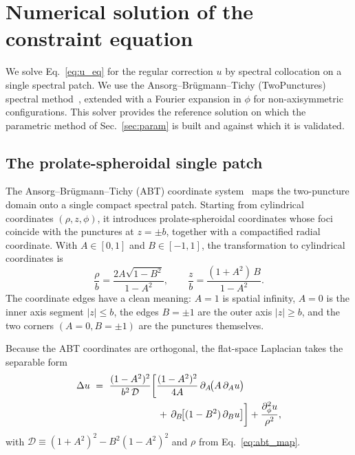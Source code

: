 \documentclass[
  aps,
  prd,
  twocolumn,
  amsmath,
  amssymb,
  nofootinbib,
  superscriptaddress,
  floatfix,
]{revtex4-2}
\begin{document}
\section{Numerical solution of the constraint equation}
\label{sec:solve}
We solve Eq.~\eqref{eq:u_eq} for the regular correction $u$ by spectral collocation on a single spectral patch.
We use the Ansorg--Br\"ugmann--Tichy (TwoPunctures) spectral method~\cite{AnsorgBruegmannTichy2004}, extended with a Fourier expansion in $\phi$ for non-axisymmetric configurations.
This solver provides the reference solution on which the parametric method of Sec.~\ref{sec:param} is built and against which it is validated.


\subsection{The prolate-spheroidal single patch}
\label{sec:solve:abt}

The Ansorg--Br\"ugmann--Tichy (ABT) coordinate system~\cite{AnsorgBruegmannTichy2004} maps the two-puncture domain onto a single compact spectral patch.
Starting from cylindrical coordinates $(\rho,z,\phi)$, it introduces prolate-spheroidal coordinates whose foci coincide with the punctures at $z=\pm b$, together with a compactified radial coordinate.
With $A\in[0,1]$ and $B\in[-1,1]$, the transformation to cylindrical coordinates is
\begin{equation}
  \frac{\rho}{b} = \frac{2A\sqrt{1-B^2}}{1-A^2}, \qquad
  \frac{z}{b}   = \frac{(1+A^2)\,B}{1-A^2}.
  \label{eq:abt_map}
\end{equation}
The coordinate edges have a
clean meaning: $A=1$ is spatial infinity, $A=0$ is the inner axis segment
$|z|\le b$, the edges $B=\pm1$ are the outer axis $|z|\ge b$, and the two corners
$(A=0,B=\pm1)$ are the punctures themselves.

Because the ABT coordinates are orthogonal, the flat-space Laplacian takes the separable form
\begin{equation}
\begin{aligned}
   \Delta u \ &= \ \frac{(1-A^2)^2}{b^2\,\mathcal{D}} \bigg[
    \frac{(1-A^2)^2}{4A}\,\partial_A\!\big(A\,\partial_A u\big) \\
    &\hspace{23mm} \, + \, \partial_B\!\big[(1-B^2)\,\partial_B u\big]\bigg]
     + \frac{\partial_{\phi}^2 u}{\rho^{2}},
\end{aligned}
  \label{eq:abt_laplacian}
\end{equation}
with $\mathcal{D} \equiv (1+A^2)^2 - B^2(1-A^2)^2$ and $\rho$ from
Eq.~\eqref{eq:abt_map}.
\end{document}
